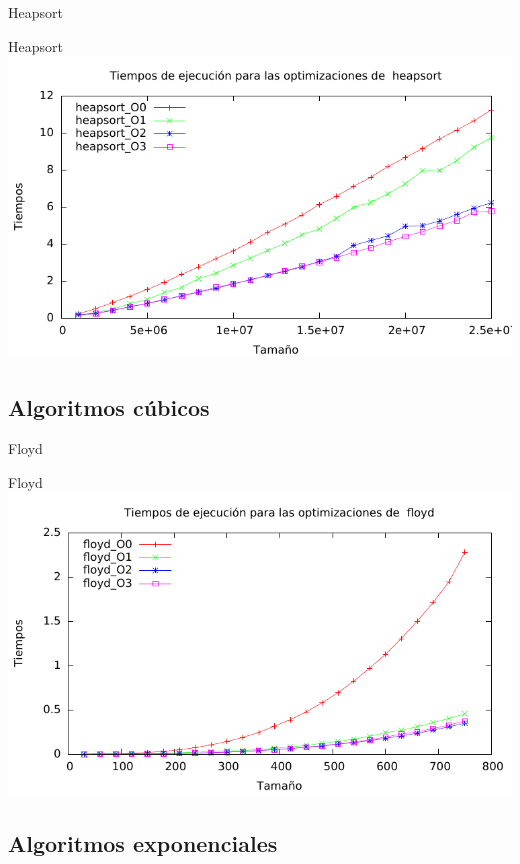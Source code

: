 \documentclass[10pt,compress,usetitleprogressbar,mathserif]{beamer}
\begin{document}
\begin{frame}{Heapsort}
	
\end{frame}

\begin{frame}{Heapsort}
	\includegraphics[width = \textwidth ]{img/heapsort_optim_g.pdf}
\end{frame}

\subsection{Algoritmos cúbicos}

\begin{frame}{Floyd}
	
\end{frame}

\begin{frame}{Floyd}
	\includegraphics[width = \textwidth ]{img/floyd_optim_g.pdf}
\end{frame}

\subsection{Algoritmos exponenciales}
\end{document}
